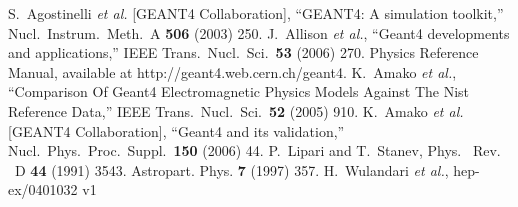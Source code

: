 \begin{thebibliography}{99}
%
  S.~Agostinelli {\it et al.}  [GEANT4 Collaboration],
  ``GEANT4: A simulation toolkit,''
  Nucl.\ Instrum.\ Meth.\ A {\bf 506} (2003) 250.
%
  J.~Allison {\it et al.},
  ``Geant4 developments and applications,''
  IEEE Trans.\ Nucl.\ Sci.\  {\bf 53} (2006) 270.
%
  Physics Reference Manual,
  available at http://geant4.web.cern.ch/geant4.
%
  K.~Amako {\it et al.},
  ``Comparison Of Geant4 Electromagnetic Physics Models Against The Nist
  Reference Data,''
  IEEE Trans.\ Nucl.\ Sci.\  {\bf 52} (2005) 910.
% 
  K.~Amako {\it et al.}  [GEANT4 Collaboration],
  ``Geant4 and its validation,''
  Nucl.\ Phys.\ Proc.\ Suppl.\  {\bf 150} (2006) 44.
%
  P.~Lipari and T.~Stanev, 
 Phys. \ Rev. \ D \textbf{44} (1991) 3543.
%
 Astropart. Phys. \textbf{7} (1997) 357. 
%
 H.~Wulandari \emph{et al.}, 
 hep-ex/0401032 v1

\end{thebibliography}
